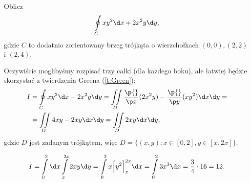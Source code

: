 \begin{example}
    Oblicz
    \[ \oint\limits_C xy^2 \d x + 2x^2y \d y, \]
    gdzie $C$ to dodatnio zorientowany brzeg trójkąta o wierzchołkach $(0, 0), (2, 2)$ i $(2, 4)$.
\end{example}
\begin{solution}
    Oczywiście moglibyśmy rozpisać trzy całki (dla każdego boku), ale łatwiej będzie skorzystać z twierdzenia Greena (\ref{t:Green}):
    \begin{align*}
        I &= \oint\limits_C xy^2 \d x + 2x^2y \d y = \iint\limits_D \frac{\p{}}{\p x}(2x^2y) - \frac{\p{}}{\p y}(xy^2) \d x \d y = \\
        &= \iint\limits_D 4xy - 2xy \d x \d y = \iint\limits_D 2xy \d x \d y,
    \end{align*}
    gdzie $D$ jest zadanym trójkątem, więc $D = \{(x, y) : x \in [0, 2], y \in [x, 2x]\}$.
    \begin{center}
    \end{center}
    \[ I = \int\limits_0^2 \d x \int\limits_x^{2x} 2xy \d y = \int\limits_0^2 x\Big[y^2\Big]_x^{2x} \d x = \int\limits_0^2 3x^3 \d x = \frac{3}{4} \cdot 16 = 12. \]
\end{solution}


